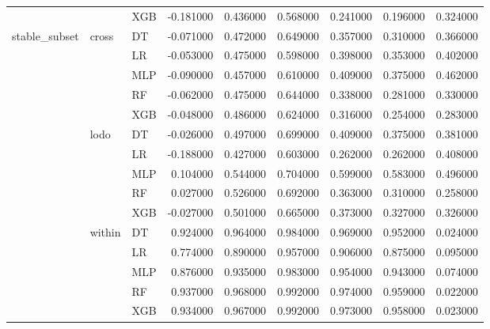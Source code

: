 \begin{tabular}{lllrrrrrr}
 &  & XGB & -0.181000 & 0.436000 & 0.568000 & 0.241000 & 0.196000 & 0.324000 \\
\cline{1-9} \cline{2-9}
\multirow[t]{15}{*}{stable_subset} & \multirow[t]{5}{*}{cross} & DT & -0.071000 & 0.472000 & 0.649000 & 0.357000 & 0.310000 & 0.366000 \\
 &  & LR & -0.053000 & 0.475000 & 0.598000 & 0.398000 & 0.353000 & 0.402000 \\
 &  & MLP & -0.090000 & 0.457000 & 0.610000 & 0.409000 & 0.375000 & 0.462000 \\
 &  & RF & -0.062000 & 0.475000 & 0.644000 & 0.338000 & 0.281000 & 0.330000 \\
 &  & XGB & -0.048000 & 0.486000 & 0.624000 & 0.316000 & 0.254000 & 0.283000 \\
\cline{2-9}
 & \multirow[t]{5}{*}{lodo} & DT & -0.026000 & 0.497000 & 0.699000 & 0.409000 & 0.375000 & 0.381000 \\
 &  & LR & -0.188000 & 0.427000 & 0.603000 & 0.262000 & 0.262000 & 0.408000 \\
 &  & MLP & 0.104000 & 0.544000 & 0.704000 & 0.599000 & 0.583000 & 0.496000 \\
 &  & RF & 0.027000 & 0.526000 & 0.692000 & 0.363000 & 0.310000 & 0.258000 \\
 &  & XGB & -0.027000 & 0.501000 & 0.665000 & 0.373000 & 0.327000 & 0.326000 \\
\cline{2-9}
 & \multirow[t]{5}{*}{within} & DT & 0.924000 & 0.964000 & 0.984000 & 0.969000 & 0.952000 & 0.024000 \\
 &  & LR & 0.774000 & 0.890000 & 0.957000 & 0.906000 & 0.875000 & 0.095000 \\
 &  & MLP & 0.876000 & 0.935000 & 0.983000 & 0.954000 & 0.943000 & 0.074000 \\
 &  & RF & 0.937000 & 0.968000 & 0.992000 & 0.974000 & 0.959000 & 0.022000 \\
 &  & XGB & 0.934000 & 0.967000 & 0.992000 & 0.973000 & 0.958000 & 0.023000 \\
\cline{1-9} \cline{2-9}
\bottomrule
\end{tabular}
